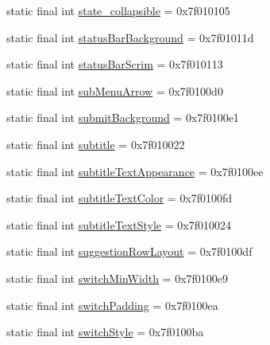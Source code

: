 \begin{CompactItemize}
\item 
static final int \hyperlink{classandroid_1_1support_1_1v7_1_1mediarouter_1_1_r_1_1attr_674923f0a7ca17f50dbdd3f5d3d0263c}{state\_\-collapsible} = 0x7f010105
\item 
static final int \hyperlink{classandroid_1_1support_1_1v7_1_1mediarouter_1_1_r_1_1attr_ca047b66cea143c46c5a7ab379e56bec}{statusBarBackground} = 0x7f01011d
\item 
static final int \hyperlink{classandroid_1_1support_1_1v7_1_1mediarouter_1_1_r_1_1attr_f914dd90c41faef0f8f7e7cea9cbc0e6}{statusBarScrim} = 0x7f010113
\item 
static final int \hyperlink{classandroid_1_1support_1_1v7_1_1mediarouter_1_1_r_1_1attr_1b845285c64b0025e836f76633879044}{subMenuArrow} = 0x7f0100d0
\item 
static final int \hyperlink{classandroid_1_1support_1_1v7_1_1mediarouter_1_1_r_1_1attr_154b380ac5e4382a2027a5bc4029291b}{submitBackground} = 0x7f0100e1
\item 
static final int \hyperlink{classandroid_1_1support_1_1v7_1_1mediarouter_1_1_r_1_1attr_4404ab1276486a31095491bdcf0ed279}{subtitle} = 0x7f010022
\item 
static final int \hyperlink{classandroid_1_1support_1_1v7_1_1mediarouter_1_1_r_1_1attr_abccd89961bcd4b0af747a52cd36e8ad}{subtitleTextAppearance} = 0x7f0100ee
\item 
static final int \hyperlink{classandroid_1_1support_1_1v7_1_1mediarouter_1_1_r_1_1attr_471a4be50e05a2ee4aaa1b5684d4c564}{subtitleTextColor} = 0x7f0100fd
\item 
static final int \hyperlink{classandroid_1_1support_1_1v7_1_1mediarouter_1_1_r_1_1attr_675e916c717e33f17a4600c2d6b76582}{subtitleTextStyle} = 0x7f010024
\item 
static final int \hyperlink{classandroid_1_1support_1_1v7_1_1mediarouter_1_1_r_1_1attr_49318af342d1d513b79017edbcbe17c9}{suggestionRowLayout} = 0x7f0100df
\item 
static final int \hyperlink{classandroid_1_1support_1_1v7_1_1mediarouter_1_1_r_1_1attr_ac6a13f053401d35106724e5b94df1cd}{switchMinWidth} = 0x7f0100e9
\item 
static final int \hyperlink{classandroid_1_1support_1_1v7_1_1mediarouter_1_1_r_1_1attr_198a9e3fe43c19c7eaffa220525ec3cd}{switchPadding} = 0x7f0100ea
\item 
static final int \hyperlink{classandroid_1_1support_1_1v7_1_1mediarouter_1_1_r_1_1attr_54686827b90a1f2aae872c4d557f71b3}{switchStyle} = 0x7f0100ba
\item 

\end{CompactItemize}
